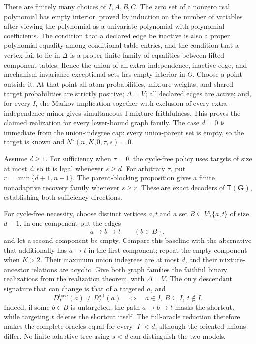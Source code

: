 There are finitely many choices of \(I,A,B,C\). The zero set of a nonzero real polynomial has empty interior, proved by induction on the number of variables after viewing the polynomial as a univariate polynomial with polynomial coefficients. The condition that a declared edge be inactive is also a proper polynomial equality among conditional-table entries, and the condition that a vertex fail to lie in \(\Delta\) is a proper finite family of equalities between lifted component tables. Hence the union of all extra-independence, inactive-edge, and mechanism-invariance exceptional sets has empty interior in \(\Theta\). Choose a point outside it. At that point all atom probabilities, mixture weights, and shared target probabilities are strictly positive; \(\Delta=V\); all declared edges are active; and, for every \(I\), the Markov implication together with exclusion of every extra-independence minor gives simultaneous I-mixture faithfulness. This proves the claimed realization for every lower-bound graph family.
The case \(d=0\) is immediate from the union-indegree cap: every union-parent set is empty, so the target is known and \(N^{\star}(n,K,0,\tau,s)=0\).

Assume \(d\ge1\). For sufficiency when \(\tau=0\), the cycle-free policy uses targets of size at most \(d\), so it is legal whenever \(s\ge d\). For arbitrary \(\tau\), put \(r=\min\{d+1,n-1\}\). The parent-blocking proposition gives a finite nonadaptive recovery family whenever \(s\ge r\). These are exact decoders of \(\mathsf T(\mathbf G)\), establishing both sufficiency directions.

For cycle-free necessity, choose distinct vertices \(a,t\) and a set \(B\subseteq V\setminus\{a,t\}\) of size \(d-1\). In one component put the edges
\[
 a\to b\to t\qquad(b\in B),
\]
and let a second component be empty. Compare this baseline with the alternative that additionally has \(a\to t\) in the first component; repeat the empty component when \(K>2\). Their maximum union indegrees are at most \(d\), and their mixture-ancestor relations are acyclic. Give both graph families the faithful binary realizations from the realization theorem, with \(\Delta=V\). The only descendant signature that can change is that of a targeted \(a\), and
\[
 D_I^{\mathrm{base}}(a)\ne D_I^{\mathrm{alt}}(a)
 \quad\Longleftrightarrow\quad
 a\in I,\ B\subseteq I,\ t\notin I.
\]
Indeed, if some \(b\in B\) is untargeted, the path \(a\to b\to t\) masks the shortcut, while targeting \(t\) deletes the shortcut itself. The full-oracle reduction therefore makes the complete oracles equal for every \(|I|<d\), although the oriented unions differ. No finite adaptive tree using \(s<d\) can distinguish the two models.

